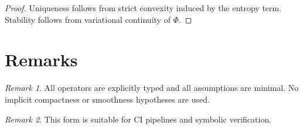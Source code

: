 \documentclass[11pt]{article}
\theoremstyle{plain}
\theoremstyle{definition}
\theoremstyle{remark}
\newtheorem{remark}{Remark}
\begin{document}
\begin{proof}
Uniqueness follows from strict convexity induced by the entropy term.
Stability follows from variational continuity of $\Phi$.
\end{proof}

\section{Remarks}

\begin{remark}
All operators are explicitly typed and all assumptions are minimal.
No implicit compactness or smoothness hypotheses are used.
\end{remark}

\begin{remark}
This form is suitable for CI pipelines and symbolic verification.
\end{remark}

% 
% 
\end{document}
